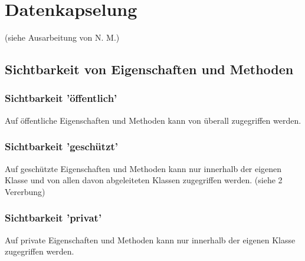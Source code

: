 \section{Datenkapselung}
	
	(siehe Ausarbeitung von N. M.)
	
	\subsection{Sichtbarkeit von Eigenschaften und Methoden}
	
	
	\subsubsection{Sichtbarkeit 'öffentlich'}
		Auf öffentliche Eigenschaften und Methoden kann von überall zugegriffen werden.
		
	\subsubsection{Sichtbarkeit 'geschützt'}
		Auf geschützte Eigenschaften und Methoden kann nur innerhalb der eigenen Klasse und von allen davon abgeleiteten Klassen
		zugegriffen werden. (siehe 2 Vererbung)

	\subsubsection{Sichtbarkeit 'privat'}
		Auf private Eigenschaften und Methoden kann nur innerhalb der eigenen Klasse zugegriffen werden.